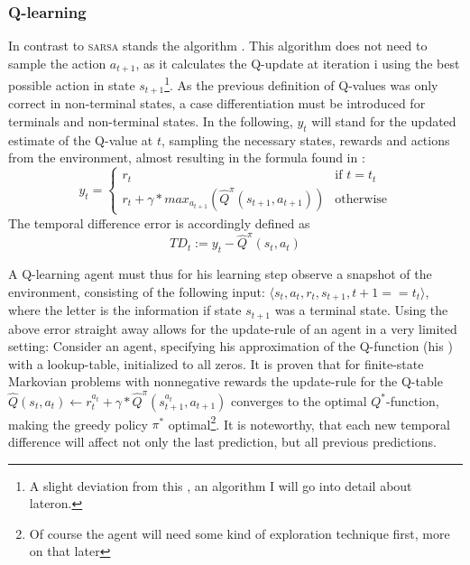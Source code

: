 \subsubsection{Q-learning}

In contrast to \textsc{sarsa} stands the  algorithm . This algorithm does not need to sample the action $a_{t+1}$, as it calculates the Q-update at iteration i using the best possible action in state $s_{t+1}$\footnote{A slight deviation from this , an algorithm I will go into detail about lateron.}. As the previous definition of Q-values was only correct in non-terminal states, a case differentiation must be introduced for terminals and non-terminal states. In the following, $y_t$ will stand for the updated estimate of the Q-value at $t$, sampling the necessary states, rewards and actions from the environment, almost resulting in the formula found in \cite{mnih_human-level_2015}:
\begin{equation} \label{eq:ycases}
y_{t} = \begin{cases} 
r_t & \text{if } t = t_t\\
r_t + \gamma * max_{a_{t+1}} (\hat{Q}^\pi( s_{t+1}, a_{t+1})) & \text{otherwise}
\end{cases}
\end{equation}
The temporal difference error is accordingly defined as 
\begin{equation}
TD_t := y_t - \hat{Q}^\pi(s_t, a_t)
\end{equation}

A Q-learning agent must thus for his learning step observe a snapshot of the environment, consisting of the following input: $\langle s_t, a_t, r_t, s_{t+1}, t+1==t_t \rangle$, where the letter is the information if state $s_{t+1}$ was a terminal state.
Using the above error straight away allows for the update-rule of an agent in a very limited setting: Consider an agent, specifying his approximation of the Q-function (his ) with a lookup-table, initialized to all zeros. It is proven that for finite-state Markovian problems with nonnegative rewards the update-rule for the Q-table $\hat{Q}(s_t,a_t) \leftarrow r_t^{a_t} + \gamma * \hat{Q}^\pi(s_{t+1}^{a_t},a_{t+1}) $ converges to the optimal $Q^*$-function, making the greedy policy $\pi^*$ optimal\footnote{Of course the agent will need some kind of exploration technique first, more on that later}. It is noteworthy, that each new temporal difference will affect not only the last prediction, but all previous predictions. %

